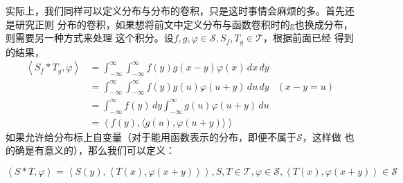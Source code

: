 \documentclass{ctexbook}
\begin{document}
实际上，我们同样可以定义分布与分布的卷积，只是这时事情会麻烦的多。首先还是研究正则
分布的卷积，如果想将前文中定义分布与函数卷积时的g也换成分布，则需要另一种方式来处理
这个积分。设$f,g,\varphi\in\mathcal{S} ,S_f,T_g\in\mathcal{T} $，根据前面已经
得到的结果，
\begin{align*}
    \left\langle S_f *T_g,\varphi\right\rangle & =\int_{-\infty}^{\infty}\int_{-\infty}^{\infty}f(y)g(x-y)\varphi(x)\,dx\,dy           \\
                                    & =\int_{-\infty}^{\infty}\int_{-\infty}^{\infty}f(y)g(u)\varphi(u+y)\,du\,dy & (x-y=u) \\
                                    & =\int_{-\infty}^{\infty}f(y)\,dy\int_{-\infty}^{\infty}g(u)\varphi(u+y)\,du           \\
                                    & =\left\langle f(y),\langle g(u),\varphi(u+y)\rangle\right\rangle
\end{align*}
如果允许给分布标上自变量（对于能用函数表示的分布，即便不属于$\mathcal{S} $，这样做
也的确是有意义的），那么我们可以定义\cite{brad_osgood_ee261}：
\begin{definition}[分布与分布的卷积]
    \begin{equation*}
    \left\langle S*T,\varphi\right\rangle=\left\langle S(y),\left\langle T(x),\varphi(x+y)\right\rangle\right\rangle,S,T\in\mathcal{T} ,\varphi\in\mathcal{S} ,\left\langle T(x),\varphi(x+y)\right\rangle\in\mathcal{S}
\end{equation*}
\end{definition}
\end{document}
